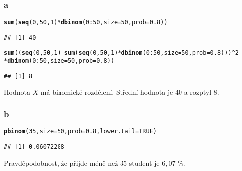 \documentclass[twoside]{article}\usepackage[]{graphicx}\usepackage[]{color}
\makeatletter
\newcommand{\hlnum}[1]{\textcolor[rgb]{0.686,0.059,0.569}{#1}}%
\newcommand{\hlopt}[1]{\textcolor[rgb]{0,0,0}{#1}}%
\newcommand{\hlstd}[1]{\textcolor[rgb]{0.345,0.345,0.345}{#1}}%
\newcommand{\hlkwc}[1]{\textcolor[rgb]{0.333,0.667,0.333}{#1}}%
\newcommand{\hlkwd}[1]{\textcolor[rgb]{0.737,0.353,0.396}{\textbf{#1}}}%
\newenvironment{kframe}{%
 \def\at@end@of@kframe{}%
 \ifinner\ifhmode%
  \def\at@end@of@kframe{\end{minipage}}%
  \begin{minipage}{\columnwidth}%
 \fi\fi%
 \def\FrameCommand##1{\hskip\@totalleftmargin \hskip-\fboxsep
 \colorbox{shadecolor}{##1}\hskip-\fboxsep
     \hskip-\linewidth \hskip-\@totalleftmargin \hskip\columnwidth}%
 \MakeFramed {\advance\hsize-\width
   \@totalleftmargin\z@ \linewidth\hsize
   \@setminipage}}%
 {\par\unskip\endMakeFramed%
 \at@end@of@kframe}
\newenvironment{knitrout}{}{} %
\makeatother
\begin{document}
\subsubsection*{a}
\begin{knitrout}
\color{fgcolor}\begin{kframe}
\begin{alltt}
\hlkwd{sum}\hlstd{(}\hlkwd{seq}\hlstd{(}\hlnum{0}\hlstd{,}\hlnum{50}\hlstd{,}\hlnum{1}\hlstd{)}\hlopt{*}\hlkwd{dbinom}\hlstd{(}\hlnum{0}\hlopt{:}\hlnum{50}\hlstd{,} \hlkwc{size} \hlstd{=} \hlnum{50}\hlstd{,} \hlkwc{prob} \hlstd{=} \hlnum{0.8}\hlstd{))}
\end{alltt}
\begin{verbatim}
## [1] 40
\end{verbatim}
\begin{alltt}
\hlkwd{sum}\hlstd{((}\hlkwd{seq}\hlstd{(}\hlnum{0}\hlstd{,}\hlnum{50}\hlstd{,}\hlnum{1}\hlstd{)}\hlopt{-}\hlkwd{sum}\hlstd{(}\hlkwd{seq}\hlstd{(}\hlnum{0}\hlstd{,}\hlnum{50}\hlstd{,}\hlnum{1}\hlstd{)}\hlopt{*}\hlkwd{dbinom}\hlstd{(}\hlnum{0}\hlopt{:}\hlnum{50}\hlstd{,} \hlkwc{size} \hlstd{=} \hlnum{50}\hlstd{,} \hlkwc{prob} \hlstd{=} \hlnum{0.8}\hlstd{)))}\hlopt{^}\hlnum{2}
    \hlopt{*}\hlkwd{dbinom}\hlstd{(}\hlnum{0}\hlopt{:}\hlnum{50}\hlstd{,} \hlkwc{size} \hlstd{=} \hlnum{50}\hlstd{,} \hlkwc{prob} \hlstd{=} \hlnum{0.8}\hlstd{))}
\end{alltt}
\begin{verbatim}
## [1] 8
\end{verbatim}
\end{kframe}
\end{knitrout}
Hodnota $X$ má binomické rozdělení. Střední hodnota je $40$ a rozptyl $8$.
\subsubsection*{b}
\begin{knitrout}
\color{fgcolor}\begin{kframe}
\begin{alltt}
\hlkwd{pbinom}\hlstd{(}\hlnum{35}\hlstd{,} \hlkwc{size}\hlstd{=}\hlnum{50}\hlstd{,} \hlkwc{prob}\hlstd{=}\hlnum{0.8}\hlstd{,} \hlkwc{lower.tail}\hlstd{=}\hlnum{TRUE}\hlstd{)}
\end{alltt}
\begin{verbatim}
## [1] 0.06072208
\end{verbatim}
\end{kframe}
\end{knitrout}
Pravděpodobnost, že přijde méně než 35 student je $6,07$ \%.
\end{document}
